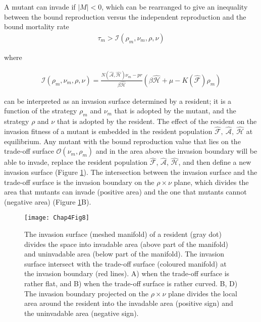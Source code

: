 \documentclass[11.5pt]{article}
\begin{document}
A mutant can invade if $|M| < 0$, which can be rearranged to give an inequality between the bound reproduction versus the independent reproduction and the bound mortality rate
\begin{align}
    \tau_{m} > \mathcal{I}(\rho_m, \nu_m, \rho, \nu)\end{align}

\noindent where

\begin{align*}
\mathcal{I}(\rho_m, \nu_m, \rho, \nu) = \frac{N(\mathcal{\hat{A}}, \mathcal{\hat{H}}) \nu_m - p r}{\beta \mathcal{\hat{H}}}
    \left(
    \beta \mathcal{\hat{H}} + \mu - K(\mathcal{\hat{F}})\rho_m
   \right)
\end{align*}

\noindent  can be interpreted as an invasion surface determined by a resident; it is a function of the strategy $\rho_m$ and $\nu_m$ that is adopted by the mutant, and the strategy $\rho$ and $\nu$ that is adopted by the resident. The effect of the resident on the invasion fitness of a mutant is embedded in the resident population $\mathcal{\hat{F}}, \ \mathcal{\hat{A}}, \ \mathcal{\hat{H}}$ at equilibrium. Any mutant with the bound reproduction value that lies on the trade-off surface $\mathcal{O}(\nu_m, \rho_m)$ and in the area above the invasion boundary will be able to invade, replace the resident population $\mathcal{\hat{F}}$, $\mathcal{\hat{A}}$, $\mathcal{\hat{H}}$, and then define a new invasion surface (Figure \ref{Chap5fig8}). The intersection between the invasion surface and the trade-off surface is the invasion boundary on the $\rho \times \nu$ plane, which divides the area that mutants can invade (positive area) and the one that mutants cannot (negative area) (Figure \ref{Chap5fig8}B). 


\begin{figure}[H]
    \centering
    \texttt{[image: Chap4Fig8]}
    \caption[An illustration of the invasion surface, trade-off surface for a resident]{The invasion surface (meshed manifold) of a resident (gray dot) divides the space into invadable area (above part of the manifold) and uninvadable area (below part of the manifold). The invasion surface intersect with the trade-off surface (coloured manifold) at the invasion boundary (red lines). A) when the trade-off surface is rather flat, and B) when the trade-off surface is rather curved. B, D) The invasion boundary projected on the $\rho \times \nu$ plane divides the local area around the resident into the invadable area (positive sign) and the uninvadable area (negative sign).}
    \label{Chap5fig8}
\end{figure}
\medskip
\end{document}
